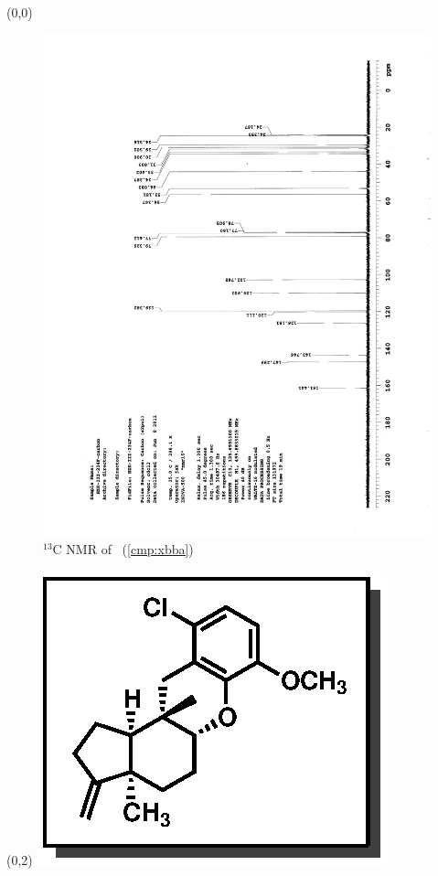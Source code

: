 \clearpage
\begin{textblock}{20}(0,0)
\begin{figure}[htb]
\caption{$^{13}$C NMR of  \CMPxbba\ (\ref{cmp:xbba})}
\includegraphics[scale=0.75, trim = 0mm 0mm 0mm 5mm,
clip]{chp_singlecarbon/images/nmr/xbbaC}
\vspace{-100pt}
\end{figure}
\end{textblock}
\begin{textblock}{1}(0,2)
\includegraphics[scale=0.8, angle=90]{chp_singlecarbon/images/xbba}
\end{textblock}
\clearpage

